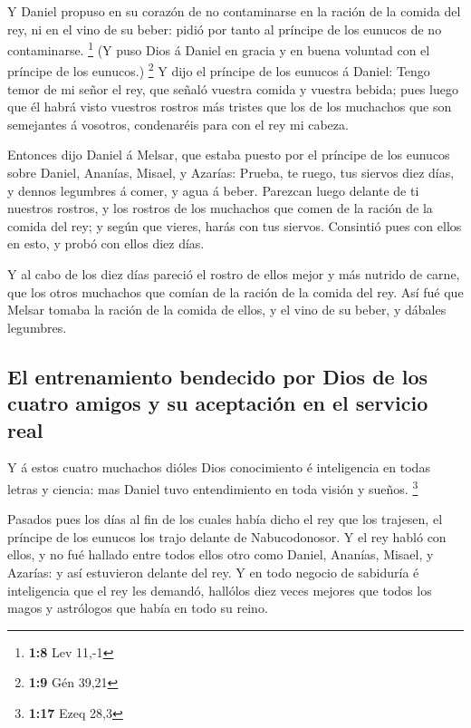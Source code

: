  Y Daniel propuso en su corazón de no contaminarse en la
ración de la comida del rey, ni en el vino de su beber: pidió por tanto
al príncipe de los eunucos de no contaminarse. \footnote{\textbf{1:8}
  Lev 11,-1}  (Y puso Dios á Daniel en gracia y en buena
voluntad con el príncipe de los eunucos.) \footnote{\textbf{1:9} Gén
  39,21}  Y dijo el príncipe de los eunucos á Daniel: Tengo
temor de mi señor el rey, que señaló vuestra comida y vuestra bebida;
pues luego que él habrá visto vuestros rostros más tristes que los de
los muchachos que son semejantes á vosotros, condenaréis para con el rey
mi cabeza.

 Entonces dijo Daniel á Melsar, que estaba puesto por el
príncipe de los eunucos sobre Daniel, Ananías, Misael, y Azarías:
 Prueba, te ruego, tus siervos diez días, y dennos
legumbres á comer, y agua á beber.  Parezcan luego delante
de ti nuestros rostros, y los rostros de los muchachos que comen de la
ración de la comida del rey; y según que vieres, harás con tus siervos.
 Consintió pues con ellos en esto, y probó con ellos diez
días.

 Y al cabo de los diez días pareció el rostro de ellos
mejor y más nutrido de carne, que los otros muchachos que comían de la
ración de la comida del rey.  Así fué que Melsar tomaba la
ración de la comida de ellos, y el vino de su beber, y dábales
legumbres.

\hypertarget{el-entrenamiento-bendecido-por-dios-de-los-cuatro-amigos-y-su-aceptaciuxf3n-en-el-servicio-real}{%
\subsection{El entrenamiento bendecido por Dios de los cuatro amigos y
su aceptación en el servicio
real}\label{el-entrenamiento-bendecido-por-dios-de-los-cuatro-amigos-y-su-aceptaciuxf3n-en-el-servicio-real}}

 Y á estos cuatro muchachos dióles Dios conocimiento é
inteligencia en todas letras y ciencia: mas Daniel tuvo entendimiento en
toda visión y sueños. \footnote{\textbf{1:17} Ezeq 28,3}

 Pasados pues los días al fin de los cuales había dicho el
rey que los trajesen, el príncipe de los eunucos los trajo delante de
Nabucodonosor.  Y el rey habló con ellos, y no fué hallado
entre todos ellos otro como Daniel, Ananías, Misael, y Azarías: y así
estuvieron delante del rey.  Y en todo negocio de sabiduría
é inteligencia que el rey les demandó, hallólos diez veces mejores que
todos los magos y astrólogos que había en todo su reino.

